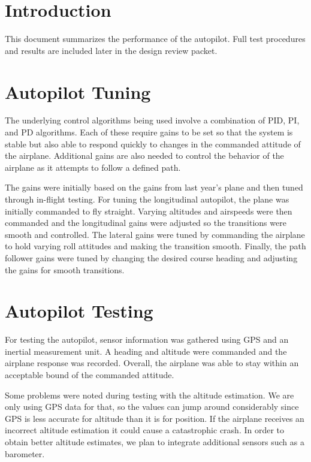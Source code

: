 \documentclass[]{auvsi_doc}
\begin{document}
\begin{AUVSITitlePage}
\begin{artifacttable}
\end{artifacttable}
\end{AUVSITitlePage}


\section{Introduction}
This document summarizes the performance of the autopilot. Full test procedures and results are included later in the design review packet.

\section{Autopilot Tuning}

The underlying control algorithms being used involve a combination of PID, PI, and PD algorithms. Each of these require gains to be set so that the system is stable but also able to respond quickly to changes in the commanded attitude of the airplane. Additional gains are also needed to control the behavior of the airplane as it attempts to follow a defined path.

The gains were initially based on the gains from last year's plane and then tuned through in-flight testing. For tuning the longitudinal autopilot, the plane was initially commanded to fly straight. Varying altitudes and airspeeds were then commanded and the longitudinal gains were adjusted so the transitions were smooth and controlled. The lateral gains were tuned by commanding the airplane to hold varying roll attitudes and making the transition smooth. Finally, the path follower gains were tuned by changing the desired course heading and adjusting the gains for smooth transitions.

\section{Autopilot Testing}

For testing the autopilot, sensor information was gathered using GPS and an inertial measurement unit. A heading and altitude were commanded and the airplane response was recorded. Overall, the airplane was able to stay within an acceptable bound of the commanded attitude. 

Some problems were noted during testing with the altitude estimation. We are only using GPS data for that, so the values can jump around considerably since GPS is less accurate for altitude than it is for position. If the airplane receives an incorrect altitude estimation it could cause a catastrophic crash. In order to obtain better altitude estimates, we plan to integrate additional sensors such as a barometer. 
\end{document}
